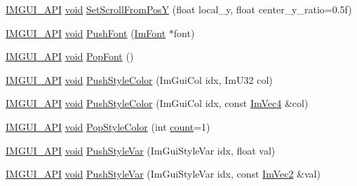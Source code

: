 \begin{DoxyCompactItemize}
\item 
\hyperlink{imgui_8h_a43829975e84e45d1149597467a14bbf5}{I\+M\+G\+U\+I\+\_\+\+A\+PI} \hyperlink{imgui__impl__opengl3__loader_8h_ac668e7cffd9e2e9cfee428b9b2f34fa7}{void} \hyperlink{namespaceImGui_a670d32573369e7ece9330d73f47e4d8b}{Set\+Scroll\+From\+PosY} (float local\+\_\+y, float center\+\_\+y\+\_\+ratio=0.\+5f)
\item 
\hyperlink{imgui_8h_a43829975e84e45d1149597467a14bbf5}{I\+M\+G\+U\+I\+\_\+\+A\+PI} \hyperlink{imgui__impl__opengl3__loader_8h_ac668e7cffd9e2e9cfee428b9b2f34fa7}{void} \hyperlink{namespaceImGui_ac5a59f4f8226fd35786d8973c85b85a9}{Push\+Font} (\hyperlink{structImFont}{Im\+Font} $\ast$font)
\item 
\hyperlink{imgui_8h_a43829975e84e45d1149597467a14bbf5}{I\+M\+G\+U\+I\+\_\+\+A\+PI} \hyperlink{imgui__impl__opengl3__loader_8h_ac668e7cffd9e2e9cfee428b9b2f34fa7}{void} \hyperlink{namespaceImGui_af66649bc37022bf3cf2496c73af9a499}{Pop\+Font} ()
\item 
\hyperlink{imgui_8h_a43829975e84e45d1149597467a14bbf5}{I\+M\+G\+U\+I\+\_\+\+A\+PI} \hyperlink{imgui__impl__opengl3__loader_8h_ac668e7cffd9e2e9cfee428b9b2f34fa7}{void} \hyperlink{namespaceImGui_a77ee84afb636e05eb4b2d6eeddcc2aa8}{Push\+Style\+Color} (Im\+Gui\+Col idx, Im\+U32 col)
\item 
\hyperlink{imgui_8h_a43829975e84e45d1149597467a14bbf5}{I\+M\+G\+U\+I\+\_\+\+A\+PI} \hyperlink{imgui__impl__opengl3__loader_8h_ac668e7cffd9e2e9cfee428b9b2f34fa7}{void} \hyperlink{namespaceImGui_a5bd052ebf55015312a53739974950e7b}{Push\+Style\+Color} (Im\+Gui\+Col idx, const \hyperlink{structImVec4}{Im\+Vec4} \&col)
\item 
\hyperlink{imgui_8h_a43829975e84e45d1149597467a14bbf5}{I\+M\+G\+U\+I\+\_\+\+A\+PI} \hyperlink{imgui__impl__opengl3__loader_8h_ac668e7cffd9e2e9cfee428b9b2f34fa7}{void} \hyperlink{namespaceImGui_a9795f730b4043a98b6254738d86efcdc}{Pop\+Style\+Color} (int \hyperlink{imgui__impl__opengl3__loader_8h_a619bc20e8198de3bd3f3d7fc34de66b2}{count}=1)
\item 
\hyperlink{imgui_8h_a43829975e84e45d1149597467a14bbf5}{I\+M\+G\+U\+I\+\_\+\+A\+PI} \hyperlink{imgui__impl__opengl3__loader_8h_ac668e7cffd9e2e9cfee428b9b2f34fa7}{void} \hyperlink{namespaceImGui_aab3f43009094462cf2a5eb554785949b}{Push\+Style\+Var} (Im\+Gui\+Style\+Var idx, float val)
\item 
\hyperlink{imgui_8h_a43829975e84e45d1149597467a14bbf5}{I\+M\+G\+U\+I\+\_\+\+A\+PI} \hyperlink{imgui__impl__opengl3__loader_8h_ac668e7cffd9e2e9cfee428b9b2f34fa7}{void} \hyperlink{namespaceImGui_ae404b6978e9aedec5c16627d8c45f923}{Push\+Style\+Var} (Im\+Gui\+Style\+Var idx, const \hyperlink{structImVec2}{Im\+Vec2} \&val)

\end{DoxyCompactItemize}
